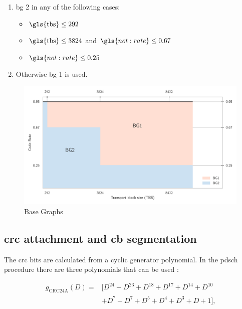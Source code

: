 \begin{enumerate}
    \item \Gls{bg} 2 in any of the following cases:
    \begin{itemize}
        \item $\mathrm{\gls{tbs}} \leq 292 $
        \item $\mathrm{\gls{tbs}} \leq 3824 $ and $\gls{not:rate} \leq 0.67 $
        \item $\gls{not:rate} \leq 0.25 $
    \end{itemize}
    \item Otherwise \gls{bg} 1 is used.
\end{enumerate}

\begin{figure}[htbp]
\includegraphics[width=\columnwidth]{figures/chp_theory/figureBG.pdf}
\caption{Base Graphs}
\label{fig:rate-vs-k}
\end{figure}

\subsection{\gls{crc} attachment and \gls{cb} segmentation}

The \gls{crc} bits are calculated from a cyclic generator polynomial.
%
In the \gls{pdsch} procedure there are three polynomials that can be used \cite{3gpp.38.212}:

\begin{equation} \label{eq.:crc24a}
    \begin{split}
        g_{\mathrm{CRC24A}}(D) = & [ D^{24} + D^{23} + D^{18} + D^{17} +  D^{14} + D^{10} \\ & + D^{7} + D^{7} + D^{5} + D^{4} + D^{3} + D + 1 ] \text{,}
    \end{split}
\end{equation}

